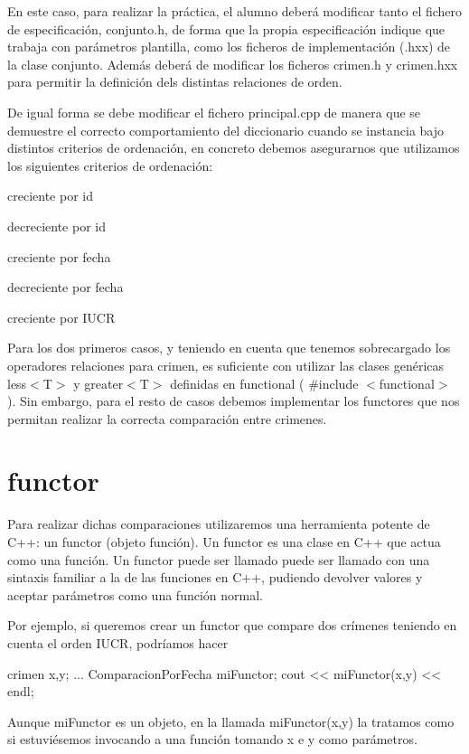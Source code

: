 En este caso, para realizar la práctica, el alumno deberá modificar tanto el fichero de especificación, conjunto.\+h, de forma que la propia especificación indique que trabaja con parámetros plantilla, como los ficheros de implementación (.hxx) de la clase conjunto. Además deberá de modificar los ficheros crimen.\+h y crimen.\+hxx para permitir la definición dels distintas relaciones de orden.

De igual forma se debe modificar el fichero principal.\+cpp de manera que se demuestre el correcto comportamiento del diccionario cuando se instancia bajo distintos criterios de ordenación, en concreto debemos asegurarnos que utilizamos los siguientes criterios de ordenación\+:

\begin{DoxyItemize}
\item creciente por id \item decreciente por id \item creciente por fecha \item decreciente por fecha \item creciente por I\+U\+C\+R\end{DoxyItemize}
Para los dos primeros casos, y teniendo en cuenta que tenemos sobrecargado los operadores relaciones para crimen, es suficiente con utilizar las clases genéricas less$<$\+T$>$ y greater$<$\+T$>$ definidas en functional ( \#include $<$functional$>$ ). Sin embargo, para el resto de casos debemos implementar los functores que nos permitan realizar la correcta comparación entre crimenes.\hypertarget{index_functor}{}\section{functor}\label{index_functor}
Para realizar dichas comparaciones utilizaremos una herramienta potente de C++\+: un functor (objeto función). Un functor es una clase en C++ que actua como una función. Un functor puede ser llamado puede ser llamado con una sintaxis familiar a la de las funciones en C++, pudiendo devolver valores y aceptar parámetros como una función normal.

Por ejemplo, si queremos crear un functor que compare dos crímenes teniendo en cuenta el orden I\+U\+C\+R, podríamos hacer


\begin{DoxyCode}
crimen x,y;
...
ComparacionPorFecha miFunctor;
cout << miFunctor(x,y) << endl;
\end{DoxyCode}
 Aunque mi\+Functor es un objeto, en la llamada mi\+Functor(x,y) la tratamos como si estuviésemos invocando a una función tomando x e y como parámetros.

